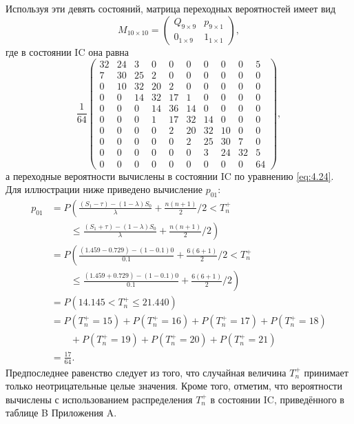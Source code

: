 Используя эти девять состояний, матрица переходных вероятностей имеет вид
\[
	M_{10\times10} = \left(\begin{array}{c|c} Q_{9\times9} & p_{9\times1} \\ \hline 0_{1\times9} & 1_{1\times1} \end{array}\right),
\]
где в состоянии IC она равна
\[
	\frac{1}{64}\left(\begin{array}{ccccccccc|c}
		32 & 24 & 3 & 0 & 0 & 0 & 0 & 0 & 0 & 5 \\
		7 & 30 & 25 & 2 & 0 & 0 & 0 & 0 & 0 & 0 \\
		0 & 10 & 32 & 20 & 2 & 0 & 0 & 0 & 0 & 0 \\
		0 & 0 & 14 & 32 & 17 & 1 & 0 & 0 & 0 & 0 \\
		0 & 0 & 0 & 14 & 36 & 14 & 0 & 0 & 0 & 0 \\
		0 & 0 & 0 & 1 & 17 & 32 & 14 & 0 & 0 & 0 \\
		0 & 0 & 0 & 0 & 2 & 20 & 32 & 10 & 0 & 0 \\
		0 & 0 & 0 & 0 & 0 & 2 & 25 & 30 & 7 & 0 \\
		0 & 0 & 0 & 0 & 0 & 0 & 3 & 24 & 32 & 5 \\
		\hline
		0 & 0 & 0 & 0 & 0 & 0 & 0 & 0 & 0 & 64
	\end{array}\right),
\]
а переходные вероятности вычислены в состоянии IC по уравнению \eqref{eq:4.24}. Для иллюстрации ниже приведено вычисление \(p_{01}\):
\begin{align*}
	p_{01} &= P\left( \frac{(S_1 - \tau) - (1 - \lambda)S_0}{\lambda} + \frac{n(n + 1)}{2}\Big/2 < T_n^+ \right. \\
	      &\qquad \left. \le \frac{(S_1 + \tau) - (1 - \lambda)S_0}{\lambda} + \frac{n(n + 1)}{2}\Big/2 \right) \\
	      &= P\left( \frac{(1.459 - 0.729) - (1 - 0.1)0}{0.1} + \frac{6(6 + 1)}{2}\Big/2 < T_n^+ \right. \\
	      &\qquad \left. \le \frac{(1.459 + 0.729) - (1 - 0.1)0}{0.1} + \frac{6(6 + 1)}{2}\Big/2 \right) \\
	      &= P(14.145 < T_n^+ \le 21.440) \\
	      &= P(T_n^+ = 15) + P(T_n^+ = 16) + P(T_n^+ = 17) + P(T_n^+ = 18) \\
	      &\qquad + P(T_n^+ = 19) + P(T_n^+ = 20) + P(T_n^+ = 21) \\
	      &= \frac{17}{64}.
\end{align*}
Предпоследнее равенство следует из того, что случайная величина \(T_n^+\) принимает только неотрицательные целые значения. Кроме того, отметим, что вероятности вычислены с использованием распределения \(T_n^+\) в состоянии IC, приведённого в таблице B Приложения A.

